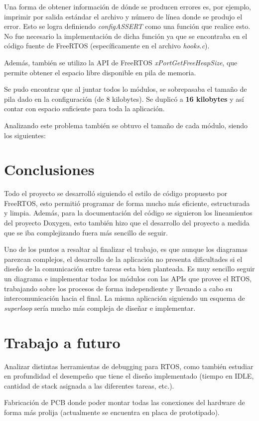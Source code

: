 \documentclass{IEEEtran}
\begin{document}
Una forma de obtener información de dónde se producen errores es, por ejemplo, imprimir por salida estándar el archivo y número de línea donde se produjo el error. Esto se logra definiendo \textit{configASSERT} como una función que realice esto. No fue necesario la implementación de dicha función ya que se encontraba en el código fuente de FreeRTOS (específicamente en el archivo \textit{hooks.c}).

Además, también se utilizo la API de FreeRTOS \textit{xPortGetFreeHeapSize}, que permite obtener el espacio libre disponible en pila de memoria.

Se pudo encontrar que al juntar todos lo módulos, se sobrepasaba el tamaño de pila dado en la configuración (de 8 kilobytes). Se duplicó a \textbf{16 kilobytes} y así contar con espacio suficiente para toda la aplicación.

Analizando este problema también se obtuvo el tamaño de cada módulo, siendo los siguientes:

\section{Conclusiones}
\label{sec:conclusiones}
Todo el proyecto se desarrolló siguiendo el estilo de código propuesto por FreeRTOS, esto permitió programar de forma mucho más eficiente, estructurada y limpia. Además, para la documentación del código se siguieron los lineamientos del proyecto Doxygen, esto también hizo que el desarrollo del proyecto a medida que se iba complejizando fuera más sencillo de seguir.

Uno de los puntos a resaltar al finalizar el trabajo, es que aunque los diagramas parezcan complejos, el desarrollo de la aplicación no presenta dificultades si el diseño de la comunicación entre tareas esta bien planteada. Es muy sencillo seguir un diagrama e implementar todas los módulos con las APIs que provee el RTOS, trabajando sobre los procesos de forma independiente y llevando a cabo su intercomunicación hacia el final. La misma aplicación siguiendo un esquema de \textit{superloop} sería mucho más compleja de diseñar e implementar.

\section{Trabajo a futuro}
Analizar distintas herramientas de debugging para RTOS, como también estudiar en profundidad el desempeño que tiene el diseño implementado (tiempo en IDLE, cantidad de stack asignada a las diferentes tareas, etc.).

Fabricación de PCB donde poder montar todas las conexiones del hardware de forma más prolija (actualmente se encuentra en placa de prototipado).

\printbibliography
\end{document}
